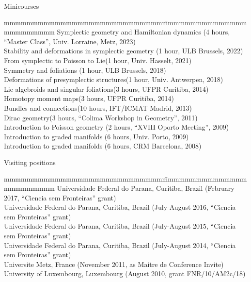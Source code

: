 \documentclass[12p]{resume}
\begin{document}
\begin{category}{Minicourses}
\citemnobullet
\begin{tabbing}
mmmmmmmmmmmmmmmmmmmmmmmmmmmm\= mmmmmmmmmmmmmmmmmmmmmmmm \kill
Symplectic geometry and Hamiltonian dynamics  \>(4 hours, ``Master Class'', Univ. Lorraine, Metz, 2023)\\%
Stability and deformations in symplectic geometry \>(1 hour, ULB Brussels, 2022)\\
From symplectic to Poisson to Lie\>(1 hour, Univ. Hasselt, 2021)\\
Symmetry and foliations \>(1 hour, ULB Brussels, 2018)\\
Deformations of presymplectic structures\>(1 hour, Univ. Antwerpen, 2018)\\
Lie algebroids and singular foliations\>(3 hours, UFPR Curitiba, 2014)\\ 
Homotopy moment maps\>(3 hours, UFPR Curitiba, 2014)\\ 
Bundles and connections\>(10 hours, IFT/ICMAT Madrid, 2013)\\
Dirac geometry\>(3 hours, ``Colima Workshop in Geometry'', 2011)\\
Introduction to Poisson geometry \>(2 hours, ``XVIII Oporto Meeting'', 2009)\\
Introduction to graded manifolds \>(6 hours, Univ. Porto, 2009)\\ 
Introduction to graded manifolds \>(6 hours, CRM Barcelona, 2008)
\end{tabbing}
\end{category}




\begin{category}{Visiting positions}
\citemnobullet
\begin{tabbing}
mmmmmmmmmmmmmmmmmmmmmmmmmmmm\= mmmmmmmmmmmmmmmmmmmmmmmm \kill
Universidade Federal do Parana, Curitiba, Brazil \>(February 2017, ``Ciencia sem Fronteiras'' grant)\\ 
Universidade Federal do Parana, Curitiba, Brazil \>(July-August 2016, ``Ciencia sem Fronteiras'' grant)\\ 
Universidade Federal do Parana, Curitiba, Brazil \>(July-August 2015, ``Ciencia sem Fronteiras'' grant)\\ 
Universidade Federal do Parana, Curitiba, Brazil \>(July-August 2014, ``Ciencia sem Fronteiras'' grant)\\ 
Universite Metz, France \>(November 2011, as Maitre de Conference Invite)\\ 
University of Luxembourg, Luxembourg\> (August 2010, grant FNR/10/AM2c/18)\\ 
\end{tabbing}
\end{category}
\end{document}
